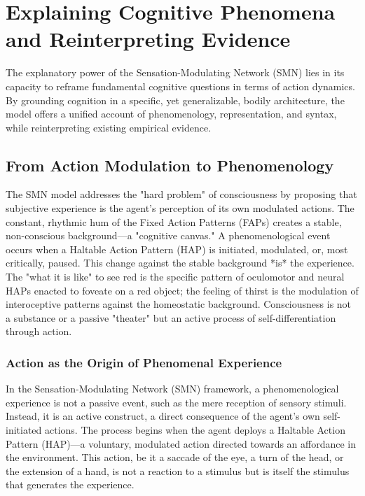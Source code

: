 \section{Explaining Cognitive Phenomena and Reinterpreting Evidence}
\label{sec:phenomena}
The explanatory power of the Sensation-Modulating Network (SMN) lies in its capacity to reframe fundamental cognitive questions in terms of action dynamics. By grounding cognition in a specific, yet generalizable, bodily architecture, the model offers a unified account of phenomenology, representation, and syntax, while reinterpreting existing empirical evidence.

\subsection{From Action Modulation to Phenomenology}
\label{subsec:phenomenology}
The SMN model addresses the "hard problem" of consciousness by proposing that subjective experience is the agent's perception of its own modulated actions. The constant, rhythmic hum of the Fixed Action Patterns (FAPs) creates a stable, non-conscious background—a "cognitive canvas." A phenomenological event occurs when a Haltable Action Pattern (HAP) is initiated, modulated, or, most critically, paused. This change against the stable background *is* the experience. The "what it is like" to see red is the specific pattern of oculomotor and neural HAPs enacted to foveate on a red object; the feeling of thirst is the modulation of interoceptive patterns against the homeostatic background. Consciousness is not a substance or a passive "theater" but an active process of self-differentiation through action.

\subsubsection{Action as the Origin of Phenomenal Experience}
\label{ssubsec:action_origin}
In the Sensation-Modulating Network (SMN) framework, a phenomenological experience is not a passive event, such as the mere reception of sensory stimuli. Instead, it is an active construct, a direct consequence of the agent's own self-initiated actions. The process begins when the agent deploys a Haltable Action Pattern (HAP)—a voluntary, modulated action directed towards an affordance in the environment. This action, be it a saccade of the eye, a turn of the head, or the extension of a hand, is not a reaction to a stimulus but is itself the stimulus that generates the experience.

